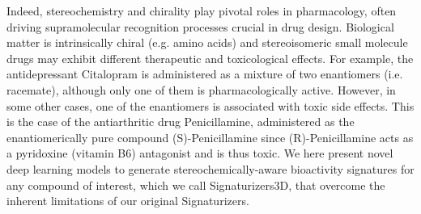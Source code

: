 Indeed, stereochemistry and chirality play pivotal roles in pharmacology\cite{scott_stereochemical_2022, h_brooks_significance_2011}, often driving supramolecular recognition processes crucial in drug design. Biological matter is intrinsically chiral\cite{inaki_cell_2016} (e.g. amino acids) and stereoisomeric small molecule drugs may exhibit different therapeutic and toxicological effects\cite{mcconathy_stereochemistry_2003, smith_chiral_2009}. For example, the antidepressant Citalopram is administered as a mixture of two enantiomers (i.e. racemate), although only one of them is pharmacologically active\cite{snchez_escitalopram_2004, sanchez_pharmacology_2006}. However, in some other cases, one of the enantiomers is associated with toxic side effects. This is the case of the antiarthritic drug Penicillamine, administered as the enantiomerically pure compound (S)-Penicillamine since (R)-Penicillamine acts as a pyridoxine (vitamin B6) antagonist and is thus toxic\cite{smith_chiral_2009, williams_enantiomers_1990}. We here present novel deep learning models to generate stereochemically-aware bioactivity signatures for any compound of interest, which we call Signaturizers3D, that overcome the inherent limitations of our original Signaturizers. 

